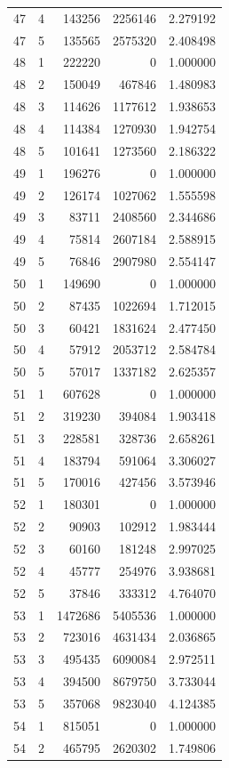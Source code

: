 \begin{longtable}{rrrrr}
47 & 4 & 143256 & 2256146 & 2.279192 \\
47 & 5 & 135565 & 2575320 & 2.408498 \\
48 & 1 & 222220 & 0 & 1.000000 \\
48 & 2 & 150049 & 467846 & 1.480983 \\
48 & 3 & 114626 & 1177612 & 1.938653 \\
48 & 4 & 114384 & 1270930 & 1.942754 \\
48 & 5 & 101641 & 1273560 & 2.186322 \\
49 & 1 & 196276 & 0 & 1.000000 \\
49 & 2 & 126174 & 1027062 & 1.555598 \\
49 & 3 & 83711 & 2408560 & 2.344686 \\
49 & 4 & 75814 & 2607184 & 2.588915 \\
49 & 5 & 76846 & 2907980 & 2.554147 \\
50 & 1 & 149690 & 0 & 1.000000 \\
50 & 2 & 87435 & 1022694 & 1.712015 \\
50 & 3 & 60421 & 1831624 & 2.477450 \\
50 & 4 & 57912 & 2053712 & 2.584784 \\
50 & 5 & 57017 & 1337182 & 2.625357 \\
51 & 1 & 607628 & 0 & 1.000000 \\
51 & 2 & 319230 & 394084 & 1.903418 \\
51 & 3 & 228581 & 328736 & 2.658261 \\
51 & 4 & 183794 & 591064 & 3.306027 \\
51 & 5 & 170016 & 427456 & 3.573946 \\
52 & 1 & 180301 & 0 & 1.000000 \\
52 & 2 & 90903 & 102912 & 1.983444 \\
52 & 3 & 60160 & 181248 & 2.997025 \\
52 & 4 & 45777 & 254976 & 3.938681 \\
52 & 5 & 37846 & 333312 & 4.764070 \\
53 & 1 & 1472686 & 5405536 & 1.000000 \\
53 & 2 & 723016 & 4631434 & 2.036865 \\
53 & 3 & 495435 & 6090084 & 2.972511 \\
53 & 4 & 394500 & 8679750 & 3.733044 \\
53 & 5 & 357068 & 9823040 & 4.124385 \\
54 & 1 & 815051 & 0 & 1.000000 \\
54 & 2 & 465795 & 2620302 & 1.749806 \\

\end{longtable}
